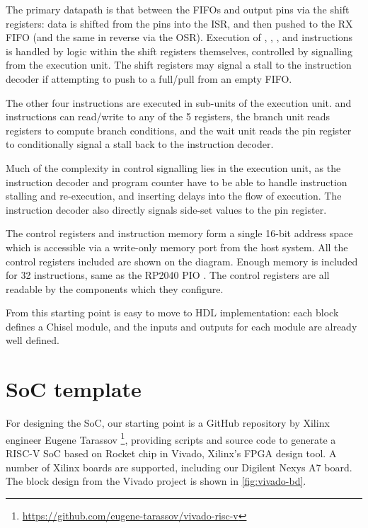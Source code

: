 The primary datapath is that between the FIFOs and output pins via the shift registers: data is shifted from the pins into the ISR, and then pushed to the RX FIFO (and the same in reverse via the OSR). Execution of , , , and  instructions is handled by logic within the shift registers themselves, controlled by signalling from the execution unit. The shift registers may signal a stall to the instruction decoder if attempting to push to a full/pull from an empty FIFO.

The other four instructions are executed in sub-units of the execution unit.  and  instructions can read/write to any of the 5 registers, the branch unit reads registers to compute branch conditions, and the wait unit reads the pin register to conditionally signal a stall back to the instruction decoder.

Much of the complexity in control signalling lies in the execution unit, as the instruction decoder and program counter have to be able to handle instruction stalling and re-execution, and inserting delays into the flow of execution. The instruction decoder also directly signals side-set values to the pin register.

The control registers and instruction memory form a single 16-bit address space which is accessible via a write-only memory port from the host system. All the control registers included are shown on the diagram. Enough memory is included for 32 instructions, same as the RP2040 PIO \cite{rp2040}. The control registers are all readable by the components which they configure.

From this starting point is easy to move to HDL implementation: each block defines a Chisel module, and the inputs and outputs for each module are already well defined.

\section{SoC template}

For designing the SoC, our starting point is a GitHub repository by Xilinx  engineer Eugene Tarassov \footnote{\url{https://github.com/eugene-tarassov/vivado-risc-v}}, providing scripts and source code to generate a RISC-V SoC based on Rocket chip in Vivado, Xilinx's FPGA design tool. A number of Xilinx boards are supported, including our Digilent Nexys A7 board. The block design from the Vivado project is shown in  \ref{fig:vivado-bd}.


